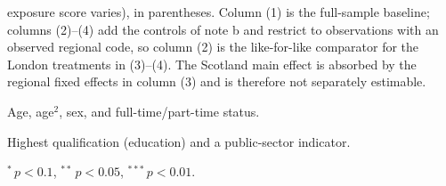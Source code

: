 \begin{threeparttable}
\begin{tablenotes}[flushleft]
exposure score varies), in parentheses. Column (1) is the full-sample
baseline; columns (2)--(4) add the controls of note b and restrict to
observations with an observed regional code, so column (2) is the
like-for-like comparator for the London treatments in (3)--(4). The
Scotland main effect is absorbed by the regional fixed effects in column
(3) and is therefore not separately estimable.
\item[a] Age, age$^2$, sex, and full-time/part-time status.
\item[b] Highest qualification (education) and a public-sector indicator.
\item[] $^{*}\,p<0.1$, $^{**}\,p<0.05$, $^{***}\,p<0.01$.
\end{tablenotes}
\end{threeparttable}
